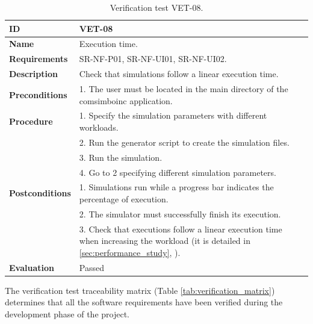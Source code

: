 \begin{center}
\begin{table}[htb]
\centering
\begin{tabular}{@{}p{2.5cm} p{13cm}@{}} 
\toprule
\textbf{ID} 					& VET-08 \\
\midrule
\textbf{Name} 				& Execution time. \\
\midrule
\textbf{Requirements} 		& SR-NF-P01, SR-NF-UI01, SR-NF-UI02. \\
\midrule
\textbf{Description} 		& Check that simulations follow a linear execution time. \\
\midrule
\textbf{Preconditions}		& 1. The user must be located in the main directory of the \gls{comsimboinc} application. \\
\midrule
\textbf{Procedure}			& 1. Specify the simulation parameters with different workloads. \\
							& 2. Run the generator script to create the simulation files.\\
							& 3. Run the simulation.\\
							
							& 4. Go to 2 specifying different simulation parameters.\\
\midrule
\textbf{Postconditions} 		& 1. Simulations run while a progress bar indicates the percentage of execution. \\
							& 2. The simulator must successfully finish its execution. \\
							& 3. Check that executions follow a linear execution time when increasing the workload (it is detailed in \ref{sec:performance_study}, \textit{\nameref{sec:performance_study}}). \\
\midrule
\textbf{Evaluation} 			& Passed \\
\bottomrule
\end{tabular}
\caption{Verification test VET-08.}
\label{tab:vet08}
\end{table}
\end{center}


\clearpage


The verification test traceability matrix (Table \ref{tab:verification_matrix}) determines that all the software requirements have been verified during the development phase of the project.

\vspace{2cm}


